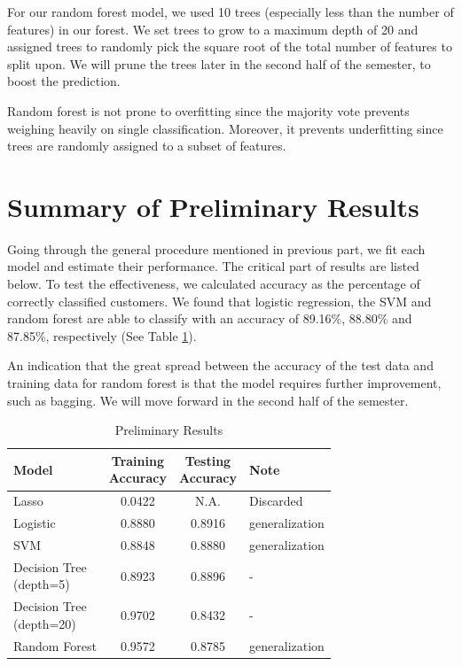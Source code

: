 \documentclass[forprint]{mytemplate}
\begin{document}
\begin{multicols}{2}

For our random forest model, we used 10 trees (especially less than the number of features) in our forest. We set trees to grow to a maximum depth of 20 and assigned trees to randomly pick the square root of the total number of features to split upon. We will prune the trees later in the second half of the semester, to boost the prediction.

Random forest is not prone to overfitting since the majority vote prevents weighing heavily on single classification. Moreover, it prevents underfitting since trees are randomly assigned to a subset of features.

\section{\color{blue}Summary of Preliminary Results}
Going through the general procedure mentioned in previous part, we fit each model and estimate their performance. The critical part of results are listed below. To test the effectiveness, we calculated accuracy as the percentage of correctly classified customers. We found that logistic regression, the SVM and random forest are able to classify with an accuracy of 89.16\%, 88.80\% and 87.85\%, respectively (See {\color{red}Table \ref{T02}}).

An indication that the great spread between the accuracy of the test data and training data for random forest is that the model requires further improvement, such as bagging. We will move forward in the second half of the semester.

\begin{table}[H]%
  \centering
  \begin{tabular}{|l|c|c|l|}
     \hline
 Model   & \makecell[tl]{Training \\Accuracy} & \makecell[tl]{Testing\\ Accuracy} &Note\\ \hline
Lasso & 0.0422 &N.A. & Discarded\\ \hline
 Logistic & 0.8880 & 0.8916& generalization\\ \hline
 SVM & 0.8848 & 0.8880&generalization\\ \hline
\makecell[tl]{Decision Tree\\(depth=5)} &0.8923 &0.8896&-\\ \hline
\makecell[tl]{Decision Tree\\(depth=20)} &0.9702 &0.8432&-\\ \hline
Random Forest& 0.9572 & 0.8785&generalization\\ \hline
   \end{tabular}
  \caption{Preliminary Results}\label{T02}
\end{table}



\end{multicols}
\end{document}
